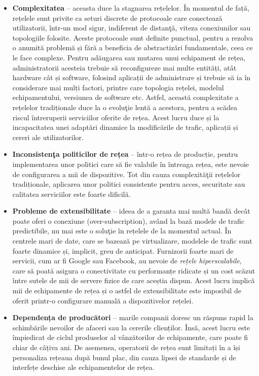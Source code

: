 \begin{itemize}
	\item \textbf{Complexitatea} – aceasta duce la stagnarea rețelelor. În momentul de față, rețelele sunt privite ca seturi discrete de protocoale care conectează utilizatorii, într-un mod sigur, indiferent de distanţă, viteza conexiunilor sau topologiile folosite. Aceste protocoale sunt definite punctual, pentru a rezolva o anumită problemă și fără a beneficia de abstractizări fundamentale, ceea ce le face complexe. Pentru adăugarea sau mutarea unui echipament de rețea, administratorii acesteia trebuie să reconfigureze mai multe entități, atât hardware cât și software, folosind aplicații de administrare și trebuie să ia în considerare mai mulți factori, printre care topologia rețelei, modelul echipamentului, versiunea de software etc. Astfel, această complexitate a rețelelor tradiționale duce la o evoluţie lentă a acestora, pentru a scădea riscul întreruperii serviciilor oferite de rețea. Acest lucru duce și la incapacitatea unei adaptări dinamice la modificările de trafic, aplicații și cereri ale utilizatorilor.
	\item \textbf{Inconsistenţa politicilor de rețea} – într-o rețea de producție, pentru implementarea unor politici care să fie valabile în întreaga rețea, este nevoie de configurarea a mii de dispozitive. Tot din cauza complexităţii rețelelor tradiționale, aplicarea unor politici consistente pentru acces, securitate sau calitatea serviciilor este foarte dificilă.
	\item \textbf{Probleme de extensibilitate} – ideea de a garanta mai multă bandă decât poate oferi o conexiune (over-subscription), având la bază modele de trafic predictibile, nu mai este o soluţie în rețelele de la momentul actual. În centrele mari de date, care se bazează pe virtualizare, modelele de trafic sunt foarte dinamice și, implicit, greu de anticipat. Furnizorii foarte mari de servicii, cum ar fi Google sau Facebook, au nevoie de \textit{rețele hiperscalabile}, care să poată asigura o conectivitate cu performanțe ridicate și un cost scăzut între sutele de mii de servere fizice de care aceștia dispun. Acest lucru implică mii de echipamente de rețea și o astfel de extensibilitate este imposibil de oferit printr-o configurare manuală a dispozitivelor rețelei. 
	\item \textbf{Dependența de producători} – marile companii doresc un răspuns rapid la schimbările nevoilor de afaceri sau la cererile clienților. Însă, acest lucru este împiedicat de ciclul produselor al vânzătorilor de echipamente, care poate fi chiar de câțiva ani. De asemenea, operatorii de rețea sunt limitați în a își personaliza rețeaua după bunul plac, din cauza lipsei de standarde și de interfețe deschise ale echipamentelor de rețea.	
\end{itemize}

